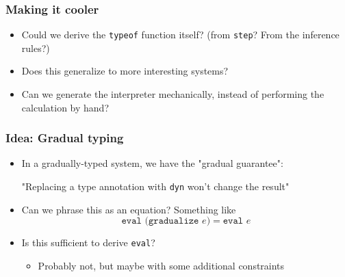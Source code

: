 \documentclass[usenames,dvipsnames]{beamer}
\begin{document}

\begin{frame}[fragile]
  \frametitle{Making it cooler}

  \begin{itemize}
    \item Could we derive the \texttt{typeof} function itself? (from
      \texttt{step}? From the inference rules?)
    \item Does this generalize to more interesting systems?
    \item Can we generate the interpreter mechanically, instead of performing
      the calculation by hand?
  \end{itemize}
\end{frame}


\begin{frame}[fragile]
  \frametitle{Idea: Gradual typing}

  \begin{itemize}
    \item In a gradually-typed system, we have the "gradual guarantee":
      \begin{center}
        "Replacing a type annotation with \texttt{dyn} won't change the result"
      \end{center}

    \item Can we phrase this as an equation? Something like
      \begin{equation}
        \texttt{eval (gradualize $e$)} = \texttt{eval }e
      \end{equation}

    \item Is this sufficient to derive \texttt{eval}?
      \begin{itemize}
        \item Probably not, but maybe with some additional constraints
      \end{itemize}
  \end{itemize}
\end{frame}
\end{document}
